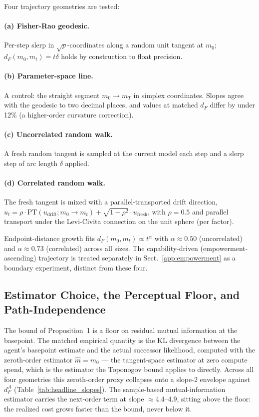 \documentclass[runningheads]{llncs}
\begin{document}
Four trajectory geometries are tested:
 
\paragraph{(a) Fisher-Rao geodesic.} Per-step slerp in
$\sqrt{p}$-coordinates along a random unit tangent at $m_0$;
$d_F(m_0, m_t) = t\delta$ holds by construction to float precision.
 
\paragraph{(b) Parameter-space line.} A control: the straight segment
$m_0 \to m_T$ in simplex coordinates. Slopes agree with the geodesic to
two decimal places, and values at matched $d_F$ differ by under 12\% (a
higher-order curvature correction).
 
\paragraph{(c) Uncorrelated random walk.} A fresh random tangent is
sampled at the current model each step and a slerp step of arc length
$\delta$ applied.
 
\paragraph{(d) Correlated random walk.} The fresh tangent is mixed with
a parallel-transported drift direction, $u_t = \rho \cdot
\mathrm{PT}(u_{\mathrm{drift}}; m_0 \to m_t) + \sqrt{1 - \rho^2} \cdot
u_{\mathrm{fresh}}$, with $\rho = 0.5$ and parallel transport under the
Levi-Civita connection on the unit sphere (per factor).
 
Endpoint-distance growth fits $d_F(m_0, m_t) \propto t^\alpha$ with
$\alpha \approx 0.50$ (uncorrelated) and $\alpha \approx 0.73$
(correlated) across all sizes. The capability-driven
(empowerment-ascending) trajectory is treated separately in
Sect.~\ref{app:empowerment} as a boundary experiment, distinct from these four.
 
\subsection{Estimator Choice, the Perceptual Floor, and Path-Independence}\label{app:estimator}
 
The bound of Proposition~1 is a floor on residual
mutual information at the basepoint. The matched empirical quantity is
the KL divergence between the agent's basepoint estimate and the actual
successor likelihood, computed with the zeroth-order estimator $\hat m =
m_0$ --- the tangent-space estimator at zero compute spend, which is the
estimator the Toponogov bound applies to directly. Across all four
geometries this zeroth-order proxy collapses onto a slope-2 envelope
against $d_F^A$ (Table~\ref{tab:headline_slopes}). The sample-based
mutual-information estimator carries the next-order term at slope
$\approx 4.4$--$4.9$, sitting above the floor: the realized cost grows
faster than the bound, never below it.
 
\end{document}
